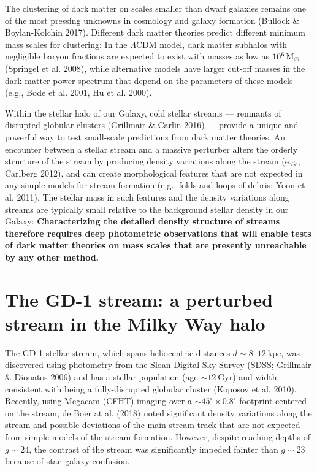 \documentclass[11pt]{article}
\date{}
\author{}
\begin{document}
\maketitle

\vspace{-1em}
The clustering of dark matter on scales smaller than dwarf galaxies remains one of the most pressing unknowns in cosmology and galaxy formation (Bullock \& Boylan-Kolchin 2017).
Different dark matter theories predict different minimum mass scales for clustering: In the $\Lambda$CDM model, dark matter subhalos with negligible baryon fractions are expected to exist with masses as low as $10^{6}\rm\,M_\odot$ (Springel et al. 2008), while alternative models have larger cut-off masses in the dark matter power spectrum that depend on the parameters of these models (e.g., Bode et al. 2001, Hu et al. 2000).

Within the stellar halo of our Galaxy, cold stellar streams --- remnants of disrupted globular clusters (Grillmair \& Carlin 2016) --- provide a unique and powerful way to test small-scale predictions from dark matter theories.
An encounter between a stellar stream and a massive perturber alters the orderly structure of the stream by producing density variations along the stream (e.g., Carlberg 2012), and can create morphological features that are not expected in any simple models for stream formation (e.g., folds and loops of debris; Yoon et al. 2011).
The stellar mass in such features and the density variations along streams are typically small relative to the background stellar density in our Galaxy:
\textbf{Characterizing the detailed density structure of streams therefore requires deep photometric observations that will enable tests of dark matter theories on mass scales that are presently unreachable by any other method.}

\section*{The GD-1 stream: a perturbed stream in the Milky Way halo}

The GD-1 stellar stream, which spans heliocentric distances $d\sim 8$--$12~\textrm{kpc}$, was discovered using photometry from the Sloan Digital Sky Survey (SDSS; Grillmair \& Dionatos 2006) and has a stellar population (age $\sim 12~\textrm{Gyr}$) and width consistent with being a fully-disrupted globular cluster (Koposov et al. 2010).
Recently, using Megacam (CFHT) imaging over a $\sim 45^\circ \times 0.8^\circ$ footprint centered on the stream, de Boer at al. (2018) noted significant density variations along the stream and possible deviations of the main stream track that are not expected from simple models of the stream formation.
However, despite reaching depths of $g \sim 24$, the contrast of the stream was significantly impeded fainter than $g \sim 23$ because of star--galaxy confusion.
\end{document}
